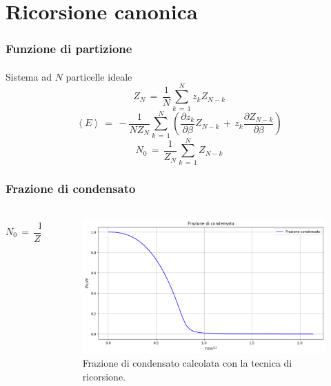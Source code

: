 \section{Ricorsione canonica}


\begin{frame}
  \frametitle{Funzione di partizione}
  \framesubtitle{}
  
    \centering
    Sistema ad $N$ particelle ideale
    \vspace{6pt}
    $$
        Z_N\,=\,\frac{1}{N}\sum_{k\,=\,1}^{N} z_kZ_{N-k}
    $$
    $$
        \left<E\right>\,=\,-\frac{1}{NZ_N}\sum_{k\,=\,1}^N\left(\frac{\partial z_k}{\partial \beta}Z_{N-k}\,+\,z_k\frac{\partial Z_{N-k}}{\partial \beta}\right)
    $$
    $$
        N_0\,=\,\frac{1}{Z_N}\sum_{k\,=\,1}^{N} Z_{N-k}
    $$


\end{frame}


\begin{frame}
    \frametitle{Frazione di condensato}
    \framesubtitle{}

    \begin{columns}
        \begin{column}{0.3\textwidth}
            $$
                N_0\,=\,\frac{1}{Z_N}\sum_{k\,=\,1}^{N} Z_{N-k}
            $$
        \end{column}
        
        \begin{column}{0.7\textwidth}
          \begin{figure}
              \includegraphics[width=\textwidth]{Immagini/frazCondRic.png}
              \caption{Frazione di condensato calcolata con la tecnica di ricorsione.}
          \end{figure}
        \end{column}
      \end{columns}
  
\end{frame}


